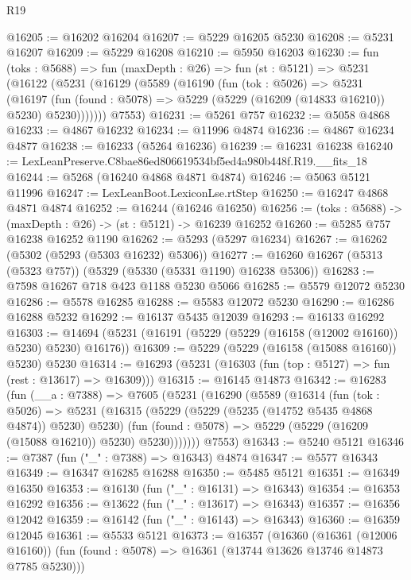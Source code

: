 \begin{lexlean}{R19}
\begin{coremodule}
@16205 := @16202 @16204
@16207 := @5229 @16205 @5230
@16208 := @5231 @16207
@16209 := @5229 @16208
@16210 := @5950 @16203
@16230 := fun (toks : @5688) =>
  fun (maxDepth : @26) =>
  fun (st : @5121) =>
  @5231
    (@16122
      (@5231
        (@16129
          (@5589
            (@16190
              (fun (tok : @5026) =>
              @5231
                (@16197
                  (fun (found : @5078) => @5229 (@5229 (@16209 (@14833 @16210)) @5230) @5230)))))))
      @7553)
@16231 := @5261 @757
@16232 := @5058 @4868
@16233 := @4867 @16232
@16234 := @11996 @4874
@16236 := @4867 @16234 @4877
@16238 := @16233 (@5264 @16236)
@16239 := @16231 @16238
@16240 := LexLeanPreserve.C8bae86ed806619534bf5ed4a980b448f.R19.__fits_18
@16244 := @5268 (@16240 @4868 @4871 @4874)
@16246 := @5063 @5121 @11996
@16247 := LexLeanBoot.LexiconLse.rtStep
@16250 := @16247 @4868 @4871 @4874
@16252 := @16244 (@16246 @16250)
@16256 := (toks : @5688) -> (maxDepth : @26) -> (st : @5121) -> @16239 @16252
@16260 := @5285 @757 @16238 @16252 @1190
@16262 := @5293 (@5297 @16234)
@16267 := @16262 (@5302 (@5293 (@5303 @16232) @5306))
@16277 := @16260 @16267 (@5313 (@5323 @757)) (@5329 (@5330 (@5331 @1190) @16238 @5306))
@16283 := @7598 @16267 @718 @423 @1188 @5230 @5066
@16285 := @5579 @12072 @5230
@16286 := @5578 @16285
@16288 := @5583 @12072 @5230
@16290 := @16286 @16288 @5232
@16292 := @16137 @5435 @12039
@16293 := @16133 @16292
@16303 := @14694 (@5231 (@16191 (@5229 (@5229 (@16158 (@12002 @16160)) @5230) @5230) @16176))
@16309 := @5229 (@5229 (@16158 (@15088 @16160)) @5230) @5230
@16314 := @16293 (@5231 (@16303 (fun (top : @5127) => fun (rest : @13617) => @16309)))
@16315 := @16145 @14873
@16342 := @16283
    (fun (__a : @7388) =>
    @7605
      (@5231
        (@16290
          (@5589
            (@16314
              (fun (tok : @5026) =>
              @5231
                (@16315
                  (@5229 (@5229 (@5235 (@14752 @5435 @4868 @4874)) @5230) @5230)
                  (fun (found : @5078) => @5229 (@5229 (@16209 (@15088 @16210)) @5230) @5230)))))))
      @7553)
@16343 := @5240 @5121
@16346 := @7387 (fun ("_" : @7388) => @16343) @4874
@16347 := @5577 @16343
@16349 := @16347 @16285 @16288
@16350 := @5485 @5121
@16351 := @16349 @16350
@16353 := @16130 (fun ("_" : @16131) => @16343)
@16354 := @16353 @16292
@16356 := @13622 (fun ("_" : @13617) => @16343)
@16357 := @16356 @12042
@16359 := @16142 (fun ("_" : @16143) => @16343)
@16360 := @16359 @12045
@16361 := @5533 @5121
@16373 := @16357
    (@16360
      (@16361 (@12006 @16160))
      (fun (found : @5078) => @16361 (@13744 @13626 @13746 @14873 @7785 @5230)))

\end{coremodule}
\end{lexlean}
